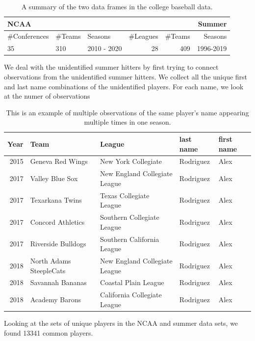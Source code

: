 \documentclass [52pt] {article}
\begin{document}
\begin{table}
\centering
\begin{tabular}{lllrrr}
  \hline
\multicolumn{3}{l}{NCAA}&\multicolumn{3}{r}{Summer}\\
  \hline
\#Conferences & \#Teams & Seasons  & \#Leagues & \#Teams & Seasons\\
\hline
35 & 310 & 2010 - 2020 & 28  & 409  & 1996-2019\\
\hline
\end{tabular}
\caption{\label{tab : cdata_sum} A summary of the two data frames in the college baseball data.}
\end{table}

We deal with the unidentified summer hitters by first trying to connect observations from the unidentified summer hitters.  We collect all the unique first and last name combinations of the unidentified players.  For each name, we look at the numer of observations 

\begin{table}[ht]
\centering
\begin{tabular}{rllll}
  \hline
 Year & Team & League & last name & first name \\ 
  \hline
2015 & Geneva Red Wings & New York Collegiate & Rodriguez & Alex \\ 
 2017 & Valley Blue Sox & New England Collegiate League & Rodriguez & Alex \\ 
  2017 & Texarkana Twins & Texas Collegiate League & Rodriguez & Alex \\ 
  2017 & Concord Athletics & Southern Collegiate League & Rodriguez & Alex \\ 
 2017 & Riverside Bulldogs & Southern California League & Rodriguez & Alex \\ 
 2018 & North Adams SteepleCats & New England Collegiate League & Rodriguez & Alex \\ 
  2018 & Savannah Bananas & Coastal Plain League & Rodriguez & Alex \\ 
  2018 & Academy Barons & California Collegiate League & Rodriguez & Alex \\ 
   \hline
\end{tabular}
\caption{\label{tab : arod} This is an example of multiple observations of the same player's name appearing multiple times in one season.}
\end{table}

Looking at the sets of unique players in the NCAA and summer data sets, we found 13341 common players.
\end{document}
